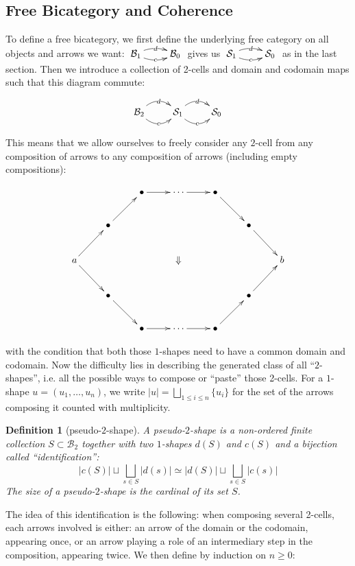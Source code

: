 \documentclass{article}
\numberwithin{equation}{section}
\theoremstyle{definition}
\theoremstyle{plain}
\newtheorem{definition}[equation]{Definition}
\begin{document}
\subsection{Free Bicategory and Coherence}

To define a free bicategory, we first define the underlying free category on all objects and arrows we want: $\xymatrix{\mathcal{B}_1 \ar@/^/[r]|d \ar@/_/[r]|c & \mathcal{B}_0 }$ gives us $\xymatrix{\mathcal{S}_1 \ar@/^/[r]|d \ar@/_/[r]|c & \mathcal{S}_0 }$ as in the last section. Then we introduce a collection of 2-cells and domain and codomain maps such that this diagram commute:

\[\xymatrix{\mathcal{B}_2 \ar@/^1pc/[r]|d \ar@/_1pc/[r]|c & \mathcal{S}_1 \ar@/^1pc/[r]|d \ar@/_1pc/[r]|c & \mathcal{S}_0}\]

This means that we allow ourselves to freely consider any $2$-cell from any composition of arrows to any composition of arrows (including empty compositions):

\[\xymatrix{
	&& \bullet \ar[r] & \cdots \ar[r] & \bullet \ar[dr]\\
	& \bullet \ar[ur] &&&& \bullet \ar[dr]\\
	a \ar[ur] \ar[dr]  &&& \Downarrow &&& b\\
	& \bullet \ar[dr] &&&& \bullet \ar[ur]\\
	&& \bullet \ar[r] & \cdots \ar[r] & \bullet \ar[ur]
}\]

with the condition that both those $1$-shapes need to have a common domain and codomain. Now the difficulty lies in describing the generated class of all ``$2$-shapes'', i.e. all the possible ways to compose or ``paste'' those 2-cells. For a $1$-shape $u = (u_1, \dots, u_n)$, we write $|u| = \bigsqcup_{1 \le i \le n} \{u_i\}$ for the set of the arrows composing it counted with multiplicity.

\begin{definition}[pseudo-$2$-shape] A pseudo-$2$-shape is a non-ordered finite collection $S \subset \mathcal{B}_2$ together with two $1$-shapes $d(S)$ and $c(S)$ and a bijection called ``identification'':
	\[|c(S)|\sqcup \bigsqcup_{s \in S}|d(s)| \simeq |d(S)|\sqcup \bigsqcup_{s \in S}|c(s)|\]
	The size of a pseudo-$2$-shape is the cardinal of its set $S$.
\end{definition}

The idea of this identification is the following: when composing several 2-cells, each arrows involved is either: an arrow of the domain or the codomain, appearing once, or an arrow playing a role of an intermediary step in the composition, appearing twice. We then define by induction on $n\ge 0$:
\end{document}
